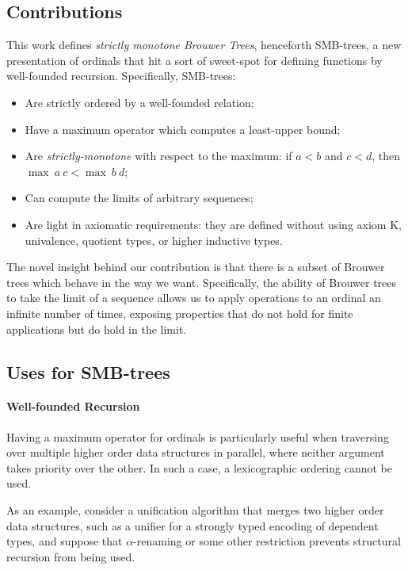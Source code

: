 \subsection{Contributions}

This work defines \textit{strictly monotone Brouwer Trees}, henceforth SMB-trees,
a new presentation of ordinals that hit a sort of sweet-spot for defining functions by
well-founded recursion. Specifically, SMB-trees:

\begin{itemize}
  \item Are strictly ordered by a well-founded relation;
  \item Have a maximum operator which computes a least-upper bound;
  \item Are \textit{strictly-monotone} with respect to the maximum: if $a < b$ and $c < d$, then $\max\ a\ c < \max\ b\ d$;
  \item Can compute the limits of arbitrary sequences;
  \item Are light in axiomatic requirements: they are defined without using axiom K,
        univalence, quotient types, or higher inductive types.
\end{itemize}

The novel insight behind our contribution is that there is a subset of
Brouwer trees which behave in the way we want. Specifically,
the ability of Brouwer trees to take the limit of a sequence allows
us to apply operations to an ordinal an infinite number of times,
exposing properties that do not hold for finite applications but do hold
in the limit.

\subsection{Uses for SMB-trees}

\paragraph{Well-founded Recursion}

Having a maximum operator for ordinals is particularly useful when traversing over multiple higher order
data structures in parallel, where neither argument takes priority over the other.
In such a case, a lexicographic ordering cannot be used.

As an example, consider a unification algorithm that merges
two higher order data structures, such as a unifier for a strongly typed encoding of dependent types,
 and suppose that $\alpha$-renaming or some other restriction prevents
 structural recursion from being used.

